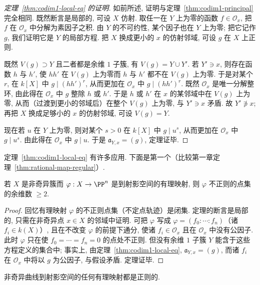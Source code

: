 \begin{proof}[定理~\ref{thm:codim1-local-eq} 的证明]
	如前所述, 证明与定理~\ref{thm:codim1-principal} 完全相同. 既然断言是局部的, 可设 $X$ 仿射. 取任一在 $Y$ 上为零的函数 $f \in \mathcal O_x$, 把 $f$ 在 $\mathcal O_x$ 中分解为素因子之积. 由 $Y$ 的不可约性, 某个因子也在 $Y$ 上为零; 把它记作 $g$, 我们证明它是 $Y$ 的局部方程. 把 $X$ 换成更小的 $x$ 的仿射邻域, 可设 $g$ 在 $X$ 上正则.

	既然 $V(g) \supset Y$ 且二者都是余维 $1$ 子簇, 有 $V(g) = Y \cup Y'$. 若 $Y' \ni x$, 则存在函数 $h$ 与 $h'$, 使 $hh'$ 在 $V(g)$ 上为零而 $h$ 与 $h'$ 都不在 $V(g)$ 上为零. 于是对某个 $r$, 在 $k[X]$ 中 $g \mid (hh')^r$, 从而更加在 $\mathcal O_x$ 中 $g \mid (hh')^r$. 既然 $\mathcal O_x$ 是唯一分解整环, 由此得在 $\mathcal O_x$ 中 $g$ 整除 $h$ 或 $h'$. 于是 $h$ 或 $h'$ 在 $x$ 的某邻域中在 $V(g)$ 上为零, 从而（过渡到更小的邻域后）在整个 $V(g)$ 上为零, 与 $Y' \ni x$ 矛盾. 故 $Y' \not\ni x$; 再把 $X$ 换成足够小的 $x$ 的仿射邻域, 可设 $V(g) = Y$.

	现在若 $u$ 在 $Y$ 上为零, 则对某个 $s > 0$ 在 $k[X]$ 中 $g \mid u^s$, 从而更加在 $\mathcal O_x$ 中 $g \mid u^s$. 由此得在 $\mathcal O_x$ 中 $g \mid u$. 于是 $\mathfrak a_{Y,x} = (g)$, 定理证毕.
\end{proof}

定理~\ref{thm:codim1-local-eq} 有许多应用. 下面是第一个（比较第一章定理~\ref{thm:rational-map-regular}）.

\begin{theorem}\label{thm:rational-map-codim2}
	若 $X$ 是非奇异簇而 $\varphi: X \to \PP^n$ 是到射影空间的有理映射, 则 $\varphi$ 不正则的点集的余维数 $\ge 2$.
\end{theorem}

\begin{proof}
	回忆有理映射 $\varphi$ 的不正则点集（不定点轨迹）是闭集. 定理的断言是局部的, 只需在非奇异点 $x \in X$ 的邻域中证明. 可把 $\varphi$ 写成 $\varphi = (f_0 : \cdots : f_n)$（诸 $f_i \in k(X)$）, 且在不改变 $\varphi$ 的前提下通分, 使诸 $f_i \in \mathcal O_x$ 且在 $\mathcal O_x$ 中没有公因子. 此时 $\varphi$ 只在使 $f_0 = \cdots = f_n = 0$ 的点处不正则. 但没有余维 $1$ 子簇 $Y$ 能含于这些方程定义的集合中; 事实上, 由定理~\ref{thm:codim1-local-eq}, $\mathfrak a_{Y,x} = (g)$, 而诸 $f_i$ 在 $\mathcal O_x$ 中将以 $g$ 为公因子, 与假设矛盾. 定理证毕.
\end{proof}

\begin{corollary}\label{cor:curve-rational-regular}
	非奇异曲线到射影空间的任何有理映射都是正则的.
\end{corollary}


